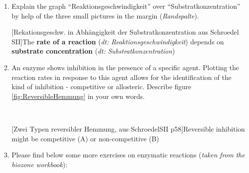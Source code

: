 \begin{enumerate}[itemsep=1.5em, leftmargin=*]
				
				\item Explain the graph "`Reaktionsgeschwindigkeit"' over "`Substratkonzentration"' by help of the three small pictures in the margin (\textit{Randspalte}).
				
				
	\vspace{4pt}
	\begin{minipage}[htbp]{1\columnwidth}
	 [Rekationsgeschw. in Abhängigkeit der Substratkonzentration aus Schroedel SII]{The \textbf{rate of a reaction} (\textit{dt: Reaktionsgeschwindigkeit}) depends on \textbf{substrate concentration} (\textit{dt: Substratkonzentration}) }  	\label{fig:ReactionrateSubstrateConc}
	\vspace{2pt}
	\end{minipage}
				
				
	\clearpage			
			\item An enzyme shows inhibition in the presence of a specific agent. Plotting the reaction rates in response to this agent allows for the identification of the kind of inhibition - competitive or allosteric. Describe figure \ref{fig:ReversibleHemmung} in your own words.
			
		
	\vspace{4pt}
	\
	\begin{minipage}[htbp]{16cm}
	 [Zwei Typen reversibler Hemmung, aus SchroedelSII p58]{Reversible inhibition might be competitive (A) or non-competitive (B)}  	\label{fig:ReversibleHemmung}
	\vspace{2pt}
	\end{minipage}
				
				
	\item Please find below some more exercises on enzymatic reactions (\textit{taken from the biozone workbook}):


\end{enumerate}
